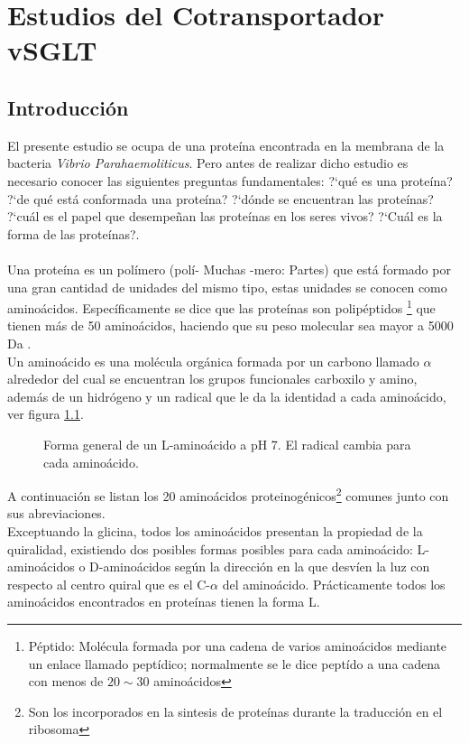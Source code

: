\chapter{Estudios del Cotransportador vSGLT}
\section{Introducci\'{o}n}
El presente estudio se ocupa de una prote\'{i}na encontrada en la membrana de la bacteria \textit{Vibrio Parahaemoliticus}. Pero antes de realizar dicho estudio es necesario conocer las siguientes preguntas fundamentales: ?`qu\'{e} es una prote\'{i}na? ?`de qu\'{e} est\'{a} conformada una prote\'{i}na? ?`d\'{o}nde se encuentran las prote\'{i}nas? ?`cu\'{a}l es el papel que desempe\~{n}an las prote\'{i}nas en los seres vivos? ?`Cu\'{a}l es la forma de las prote\'{i}nas?.\\ \\

Una prote\'{i}na es un pol\'{i}mero (pol\'{i}- Muchas -mero: Partes) que est\'{a} formado por una gran cantidad de unidades del mismo tipo, estas unidades se conocen como amino\'{a}cidos. Espec\'{i}ficamente se dice que las prote\'{i}nas son polip\'{e}ptidos \footnote{P\'{e}ptido: Mol\'{e}cula formada por una cadena de varios amino\'{a}cidos mediante un enlace llamado pept\'{i}dico; normalmente se le dice pept\'{i}do a una cadena con menos de $20\sim30$  amino\'{a}cidos} que tienen m\'{a}s de 50 amino\'{a}cidos, haciendo que su peso molecular sea mayor a 5000 Da \cite{Kuchel}.\\

Un amino\'{a}cido es una mol\'{e}cula org\'{a}nica formada por un carbono llamado $\alpha$ alrededor del cual se encuentran los grupos funcionales carboxilo y amino, adem\'{a}s de un hidr\'{o}geno y un radical que le da la identidad a cada amino\'{a}cido, ver figura \ref{fig:amino}.\\
\begin{figure}
\centering
{}
\caption{Forma general de un L-amino\'{a}cido a pH 7. El radical  cambia para cada amino\'{a}cido.}\label{fig:amino}
\end{figure}
A continuaci\'{o}n se listan los 20 amino\'{a}cidos proteinog\'{e}nicos\footnote{Son los incorporados en la sintesis de prote\'{i}nas durante la traducci\'{o}n en el ribosoma} comunes junto con sus abreviaciones.\\

Exceptuando la glicina, todos los amino\'{a}cidos presentan la propiedad de la quiralidad, existiendo dos posibles formas posibles para cada amino\'{a}cido: L-amino\'{a}cidos o D-amino\'{a}cidos seg\'{u}n la direcci\'{o}n en la que desv\'{i}en la luz con respecto al centro quiral que es el C-$\alpha$ del amino\'{a}cido.  Pr\'{a}cticamente todos los amino\'{a}cidos encontrados en prote\'{i}nas tienen la forma L.
